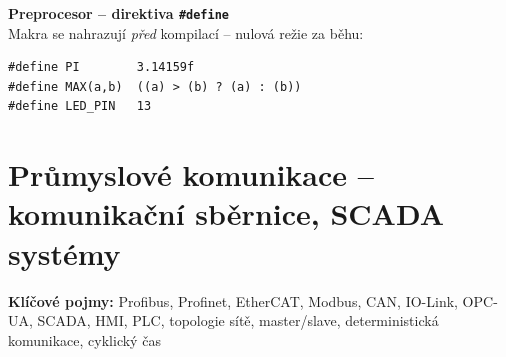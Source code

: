 \documentclass[a4paper,10pt]{article}
\begin{document}
\begin{vysvetlenibox}
\textbf{Preprocesor -- direktiva \texttt{\#define}}\\
Makra se nahrazují \textit{před} kompilací -- nulová režie za běhu:
\begin{vzorcebox}
\begin{verbatim}
#define PI        3.14159f
#define MAX(a,b)  ((a) > (b) ? (a) : (b))
#define LED_PIN   13
\end{verbatim}
\end{vzorcebox}
\end{vysvetlenibox}

\section{Průmyslové komunikace -- komunikační sběrnice, SCADA systémy}

\begin{pojmybox}
\textbf{Klíčové pojmy:}
Profibus, Profinet, EtherCAT, Modbus, CAN, IO-Link,
OPC-UA, SCADA, HMI, PLC, topologie sítě,
master/slave, deterministická komunikace, cyklický čas
\end{pojmybox}
\end{document}
